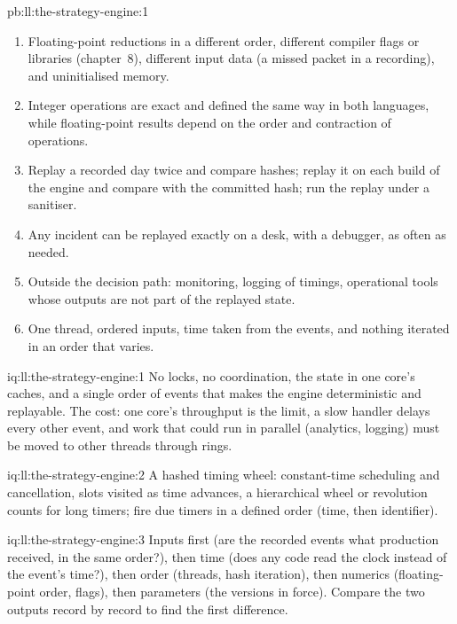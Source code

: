\begin{solution}{pb:ll:the-strategy-engine:1}
\begin{enumerate}
\item Floating-point reductions in a different order, different compiler flags or libraries (chapter~8), different input data
(a missed packet in a recording), and uninitialised memory.
\item Integer operations are exact and defined the same way in both languages, while floating-point results depend on the order
and contraction of operations.
\item Replay a recorded day twice and compare hashes; replay it on each build of the engine and compare with the committed
hash; run the replay under a sanitiser.
\item Any incident can be replayed exactly on a desk, with a debugger, as often as needed.
\item Outside the decision path: monitoring, logging of timings, operational tools whose outputs are not part of the replayed
state.
\item One thread, ordered inputs, time taken from the events, and nothing iterated in an order that varies.
\end{enumerate}
\end{solution}

\begin{solution}{iq:ll:the-strategy-engine:1}
No locks, no coordination, the state in one core's caches, and a single order of events that makes the engine deterministic
and replayable. The cost: one core's throughput is the limit, a slow handler delays every other event, and work that could run
in parallel (analytics, logging) must be moved to other threads through rings.
\end{solution}

\begin{solution}{iq:ll:the-strategy-engine:2}
A hashed timing wheel: constant-time scheduling and cancellation, slots visited as time advances, a hierarchical wheel or
revolution counts for long timers; fire due timers in a defined order (time, then identifier).
\end{solution}

\begin{solution}{iq:ll:the-strategy-engine:3}
Inputs first (are the recorded events what production received, in the same order?), then time (does any code read the clock
instead of the event's time?), then order (threads, hash iteration), then numerics (floating-point order, flags), then
parameters (the versions in force). Compare the two outputs record by record to find the first difference.
\end{solution}

